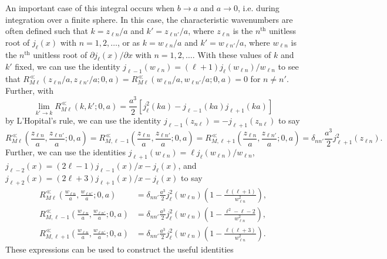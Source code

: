 An important case of this integral occurs when $b\to a$ and $a\to0$, i.e. during integration over a finite sphere. In this case, the characteristic wavenumbers are often defined such that $k = z_{\ell n}/a$ and $k' = z_{\ell n'}/a$, where $z_{\ell n}$ is the $n^\mathrm{th}$ unitless root of $j_\ell(x)$ with $n = 1,2,\ldots$, or as $k = w_{\ell n}/a$ and $k' = w_{\ell n'}/a$, where $w_{\ell n}$ is the $n^\mathrm{th}$ unitless root of $\partial j_\ell(x)/\partial x$ with $n = 1,2,\ldots$. With these values of $k$ and $k'$ fixed, we can use the identity $j_{\ell - 1}(w_{\ell n}) = (\ell + 1)j_\ell(w_{\ell n})/w_{\ell n}$ to see that $R_{M\ell}^\ll(z_{\ell n}/a,z_{\ell n'}/a;0,a) = R_{M\ell}^\ll(w_{\ell n}/a,w_{\ell n'}/a;0,a) = 0$ for $n\neq n'$. Further, with
\begin{equation}
\lim_{k'\to k}R_{M\ell}^\ll(k,k';0,a) = \frac{a^3}{2}\left[j_\ell^2(ka) - j_{\ell - 1}(ka)j_{\ell + 1}(ka)\right]
\end{equation}
by L'Hopital's rule, we can use the identity $j_{\ell - 1}(z_{n\ell}) = -j_{\ell + 1}(z_{n\ell})$ to say
\begin{equation}
R_{M\ell}^\ll\left(\frac{z_{\ell n}}{a},\frac{z_{\ell n'}}{a};0,a\right) = R_{M,\ell-1}^\ll\left(\frac{z_{\ell n}}{a},\frac{z_{\ell n'}}{a};0,a\right) = R_{M,\ell+1}^\ll\left(\frac{z_{\ell n}}{a},\frac{z_{\ell n'}}{a};0,a\right) = \delta_{nn'}\frac{a^3}{2}j_{\ell + 1}^2(z_{\ell n}).
\end{equation}
Further, we can use the identities $j_{\ell + 1}(w_{\ell n}) = \ell j_\ell(w_{\ell n})/w_{\ell n}$, $j_{\ell - 2}(x) = (2\ell - 1)j_{\ell - 1}(x)/x - j_\ell(x)$, and $j_{\ell + 2}(x) = (2\ell + 3)j_{\ell + 1}(x)/x - j_\ell(x)$ to say
\begin{equation}
\begin{split}
R_{M\ell}^\ll\left(\frac{w_{\ell n}}{a},\frac{w_{\ell n'}}{a};0,a\right) &= \delta_{nn'}\frac{a^3}{2}j_\ell^2(w_{\ell n})\left(1 - \frac{\ell(\ell + 1)}{w_{\ell n}^2}\right),\\
R_{M,\ell - 1}^\ll\left(\frac{w_{\ell n}}{a},\frac{w_{\ell n'}}{a};0,a\right) &= \delta_{nn'}\frac{a^3}{2}j_{\ell}^2(w_{\ell n})\left(1 - \frac{\ell^2 - \ell-2}{w_{\ell n}^2}\right),\\
R_{M,\ell + 1}^\ll\left(\frac{w_{\ell n}}{a},\frac{w_{\ell n'}}{a};0,a\right) &= \delta_{nn'}\frac{a^3}{2}j_{\ell}^2(w_{\ell n})\left(1 - \frac{\ell(\ell + 3)}{w_{\ell n}^2}\right).
\end{split}
\end{equation}
These expressions can be used to construct the useful identities
